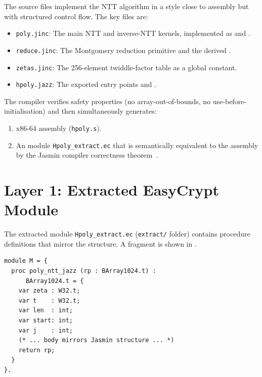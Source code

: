 The \jasmin{} source files implement the NTT algorithm in a style close to
assembly but with structured control flow.  The key files are:
\begin{itemize}
  \item \texttt{poly.jinc}: The main NTT and inverse-NTT kernels,
        implemented as  and
        .

  \item \texttt{reduce.jinc}: The Montgomery reduction primitive
         and the derived .

  \item \texttt{zetas.jinc}: The 256-element twiddle-factor table as a
        global constant.

  \item \texttt{hpoly.jazz}: The exported entry points
         and
        .
\end{itemize}

The \jasmin{} compiler verifies safety properties (no array-out-of-bounds, no
use-before-initialisation) and then simultaneously generates:
\begin{enumerate}
  \item x86-64 assembly (\texttt{hpoly.s}).
  \item An \easycrypt{} module \texttt{Hpoly\_extract.ec} that is
        semantically equivalent to the assembly by the Jasmin compiler
        correctness theorem~\cite{Almeida2017}.
\end{enumerate}

\section{Layer 1: Extracted EasyCrypt Module}

The extracted module \texttt{Hpoly\_extract.ec} (\texttt{extract/} folder)
contains \easycrypt{} procedure definitions that mirror the \jasmin{}
structure.  A fragment is shown in .

\begin{lstlisting}[language=EasyCrypt,
  caption={Fragment of extracted procedure in Hpoly\_extract.ec},
  label={lst:extract}]
module M = {
  proc poly_ntt_jazz (rp : BArray1024.t) :
      BArray1024.t = {
    var zeta : W32.t;
    var t    : W32.t;
    var len  : int;
    var start: int;
    var j    : int;
    (* ... body mirrors Jasmin structure ... *)
    return rp;
  }
}.
\end{lstlisting}


